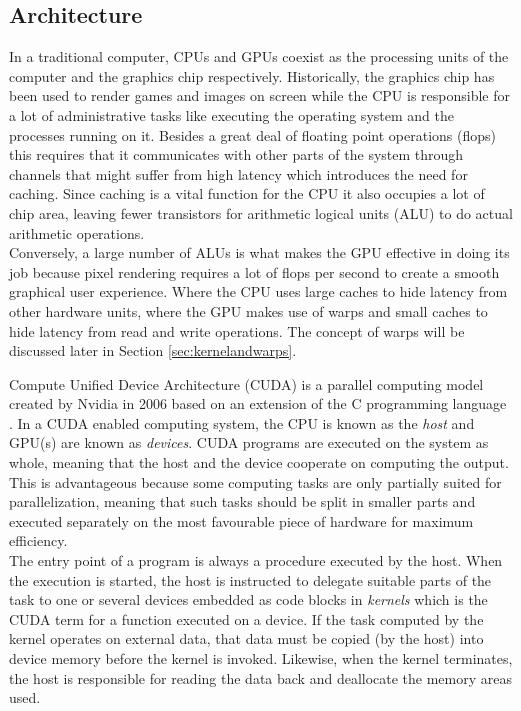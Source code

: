 
\subsection{Architecture}
In a traditional computer, CPUs and GPUs coexist as the processing units of the computer and the graphics chip respectively. Historically, the graphics chip has been used to render games and images on screen while the CPU is responsible for a lot of administrative tasks like executing the operating system and the processes running on it. Besides a great deal of floating point operations (flops) this requires that it communicates with other parts of the system through channels that might suffer from high latency which introduces the need for caching. Since caching is a vital function for the CPU it also occupies a lot of chip area, leaving fewer transistors for arithmetic logical units (ALU) to do actual arithmetic operations. \\

Conversely, a large number of ALUs is what makes the GPU effective in doing its job because pixel rendering requires a lot of flops per second to create a smooth graphical user experience. Where the CPU uses large caches to hide latency from other hardware units, where the GPU makes use of warps and small caches to hide latency from read and write operations. The concept of warps will be discussed later in Section \ref{sec:kernelandwarps}.


Compute Unified Device Architecture (CUDA) is a parallel computing model created by Nvidia in 2006 based on an extension of the C programming language \cite{pmpp}. In a CUDA enabled computing system, the CPU is known as the \emph{host} and GPU(s) are known as \emph{devices}. CUDA programs are executed on the system as whole, meaning that the host and the device cooperate on computing the output. This is advantageous because some computing tasks are only partially suited for parallelization, meaning that such tasks should be split in smaller parts and executed separately on the most favourable piece of hardware for maximum efficiency.\\

The entry point of a program is always a procedure executed by the host. When the execution is started, the host is instructed to delegate suitable parts of the task to one or several devices embedded as code blocks in \emph{kernels} which is the CUDA term for a function executed on a device. If the task computed by the kernel operates on external data, that data must be copied (by the host) into device memory before the kernel is invoked. Likewise, when the kernel terminates, the host is responsible for reading the data back and deallocate the memory areas used.\\

